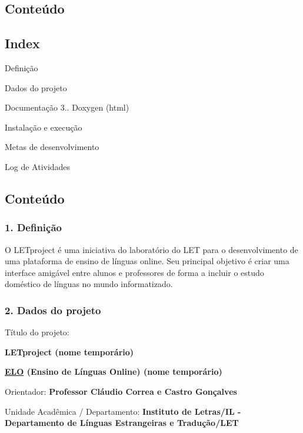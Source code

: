 \subsection*{Conteúdo}

\subsection*{Index}


\begin{DoxyEnumerate}
\item Definição
\item Dados do projeto
\item Documentação 3.. Doxygen (html)
\item Instalação e execução
\item Metas de desenvolvimento
\item Log de Atividades
\end{DoxyEnumerate}

\subsection*{Conteúdo}

\subsubsection*{1. Definição}

O L\-E\-Tproject é uma iniciativa do laboratório do L\-E\-T para o desenvolvimento de uma plataforma de ensino de línguas online. Seu principal objetivo é criar uma interface amigável entre alunos e professores de forma a incluir o estudo doméstico de línguas no mundo informatizado.

\subsubsection*{2. Dados do projeto}

Título do projeto\-:
\begin{DoxyItemize}
\item {\bfseries L\-E\-Tproject (nome temporário)}
\item {\bfseries \hyperlink{namespaceELO}{E\-L\-O} (Ensino de Línguas Online) (nome temporário)}
\end{DoxyItemize}

Orientador\-: {\bfseries Professor Cláudio Correa e Castro Gonçalves}

Unidade Acadêmica / Departamento\-: {\bfseries Instituto de Letras/\-I\-L -\/ Departamento de Línguas Estrangeiras e Tradução/\-L\-E\-T}

